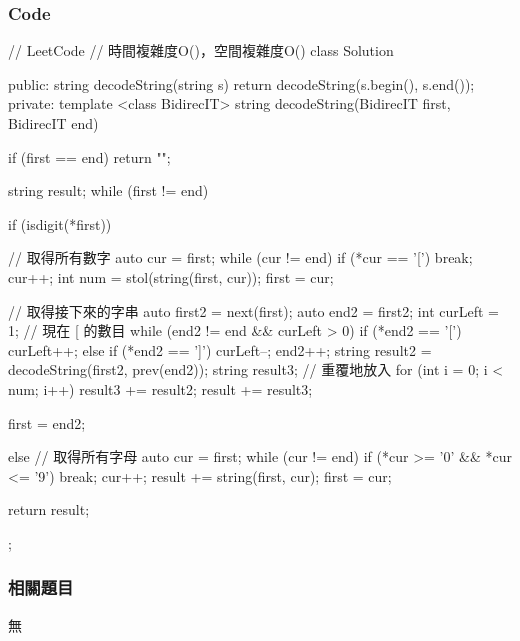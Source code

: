 \subsubsection{Code}
\begin{Code}
// LeetCode
// 時間複雜度O()，空間複雜度O()
class Solution {
public:
    string decodeString(string s) {
        return decodeString(s.begin(), s.end());
    }
private:
    template <class BidirecIT>
        string decodeString(BidirecIT first, BidirecIT end)
    {
        if (first == end) return "";

        string result;
        while (first != end)
        {
            if (isdigit(*first))
            {
                // 取得所有數字
                auto cur = first;
                while (cur != end) { if (*cur == '[') break; cur++; }
                int num = stol(string(first, cur));
                first = cur;

                // 取得接下來的字串
                auto first2 = next(first);
                auto end2 = first2;
                int curLeft = 1; // 現在 [ 的數目
                while (end2 != end && curLeft > 0)
                {
                    if (*end2 == '[')
                        curLeft++;
                    else if (*end2 == ']')
                        curLeft--;
                    end2++;
                }
                string result2 = decodeString(first2, prev(end2));
                string result3;
                // 重覆地放入
                for (int i = 0; i < num; i++)
                    result3 += result2;
                result += result3;

                first = end2;
            }
            else
            {
                // 取得所有字母
                auto cur = first;
                while (cur != end) { if (*cur >= '0' && *cur <= '9') break; cur++; }
                result += string(first, cur);
                first = cur;
            }
        }
        return result;
    }
};
\end{Code}


\subsubsection{相關題目}
\begindot
\item 無
\myenddot
